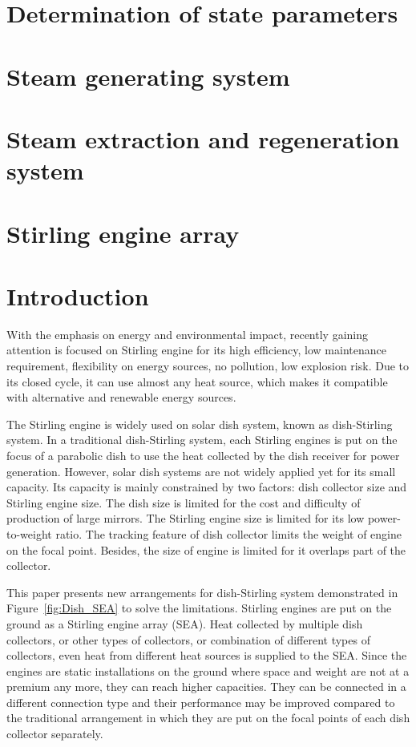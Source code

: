 \section{Determination of state parameters}
\section{Steam generating system}
\section{Steam extraction and regeneration system}
\section{Stirling engine array}

\section{Introduction}
With the emphasis on energy and environmental impact, recently gaining attention is focused on Stirling engine for its high efficiency, low maintenance requirement, flexibility on energy sources, no pollution, low explosion risk. Due to its closed cycle, it can use almost any heat source, which makes it compatible with alternative and renewable energy sources.

The Stirling engine is widely used on solar dish system, known as dish-Stirling system. In a traditional dish-Stirling system, each Stirling engines is put on the focus of a parabolic dish to use the heat collected by the dish receiver for power generation. However, solar dish systems are not widely applied yet for its small capacity. Its capacity is mainly constrained by two factors: dish collector size and Stirling engine size. The dish size is limited for the cost and difficulty of production of large mirrors. The Stirling engine size is limited for its low power-to-weight ratio. The tracking feature of dish collector limits the weight of engine on the focal point. Besides, the size of engine is limited for it overlaps part of the collector.

This paper presents new arrangements for dish-Stirling system demonstrated in Figure~\ref{fig:Dish_SEA} to solve the limitations. Stirling engines are put on the ground as a Stirling engine array (SEA). Heat collected by multiple dish collectors, or other types of collectors, or combination of different types of collectors, even heat from different heat sources is supplied to the SEA. Since the engines are static installations on the ground where space and weight are not at a premium any more, they can reach higher capacities. They can be connected in a different connection type and their performance may be improved compared to the traditional arrangement in which they are put on the focal points of each dish collector separately.

